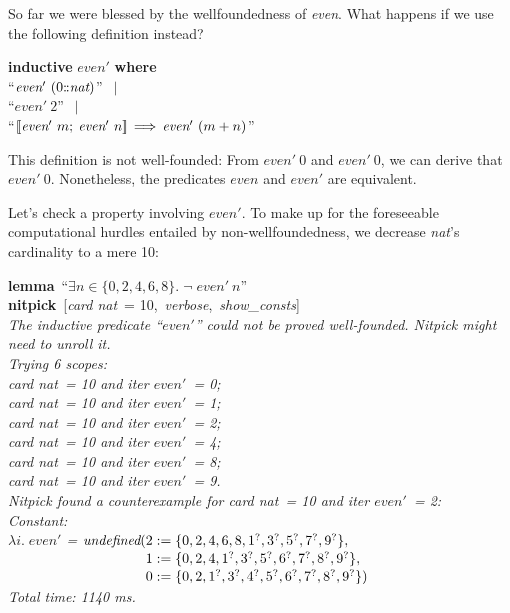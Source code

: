 \documentclass[a4paper,12pt]{article}
\def\Colon{\mathord{:\mkern-1.5mu:}}
\def\undef{\textit{undefined}}
\def\Q{{\smash{\lower.2ex\hbox{$\scriptstyle?$}}}}
\begin{document}
So far we were blessed by the wellfoundedness of \textit{even}. What happens if
we use the following definition instead?

\prew
\textbf{inductive} $\textit{even}'$ \textbf{where} \\
``$\textit{even}'~(0{\Colon}\textit{nat})$'' $\,\mid$ \\
``$\textit{even}'~2$'' $\,\mid$ \\
``$\mathopen{[\![}\textit{even}'~m;\> \textit{even}'~n\mathclose{]\!]} \,\Longrightarrow\, \textit{even}'~(m + n)$''
\postw

This definition is not well-founded: From $\textit{even}'~0$ and
$\textit{even}'~0$, we can derive that $\textit{even}'~0$. Nonetheless, the
predicates $\textit{even}$ and $\textit{even}'$ are equivalent.

Let's check a property involving $\textit{even}'$. To make up for the
foreseeable computational hurdles entailed by non-wellfoundedness, we decrease
\textit{nat}'s cardinality to a mere 10:

\prew
\textbf{lemma}~``$\exists n \in \{0, 2, 4, 6, 8\}.\;
\lnot\;\textit{even}'~n$'' \\
\textbf{nitpick}~[\textit{card nat}~= 10,\, \textit{verbose},\, \textit{show\_consts}] \\[2\smallskipamount]
\slshape
The inductive predicate ``$\textit{even}'\!$'' could not be proved well-founded.
Nitpick might need to unroll it. \\[2\smallskipamount]
Trying 6 scopes: \\
\hbox{}\qquad \textit{card nat}~= 10 and \textit{iter} $\textit{even}'$~= 0; \\
\hbox{}\qquad \textit{card nat}~= 10 and \textit{iter} $\textit{even}'$~= 1; \\
\hbox{}\qquad \textit{card nat}~= 10 and \textit{iter} $\textit{even}'$~= 2; \\
\hbox{}\qquad \textit{card nat}~= 10 and \textit{iter} $\textit{even}'$~= 4; \\
\hbox{}\qquad \textit{card nat}~= 10 and \textit{iter} $\textit{even}'$~= 8; \\
\hbox{}\qquad \textit{card nat}~= 10 and \textit{iter} $\textit{even}'$~= 9. \\[2\smallskipamount]
Nitpick found a counterexample for \textit{card nat}~= 10 and \textit{iter} $\textit{even}'$~= 2: \\[2\smallskipamount]
\hbox{}\qquad Constant: \nopagebreak \\
\hbox{}\qquad\qquad $\lambda i.\; \textit{even}'$ = $\undef(\!\begin{aligned}[t]
& 2 := \{0, 2, 4, 6, 8, 1^\Q, 3^\Q, 5^\Q, 7^\Q, 9^\Q\}, \\[-2pt]
& 1 := \{0, 2, 4, 1^\Q, 3^\Q, 5^\Q, 6^\Q, 7^\Q, 8^\Q, 9^\Q\}, \\[-2pt]
& 0 := \{0, 2, 1^\Q, 3^\Q, 4^\Q, 5^\Q, 6^\Q, 7^\Q, 8^\Q, 9^\Q\})\end{aligned}$ \\[2\smallskipamount]
Total time: 1140 ms.
\postw
\end{document}
